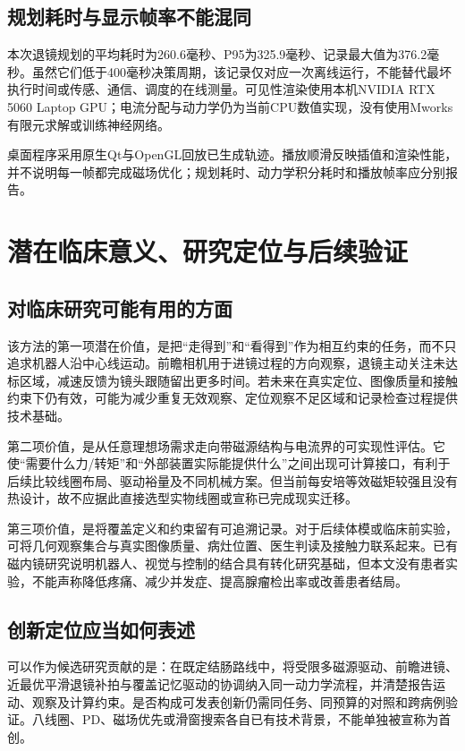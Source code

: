 \documentclass[UTF8,a4paper,zihao=5,fontset=windows]{ctexart}
\begin{document}
\FloatBarrier
\subsection{规划耗时与显示帧率不能混同}
本次退镜规划的平均耗时为260.6毫秒、P95为325.9毫秒、记录最大值为376.2毫秒。虽然它们低于400毫秒决策周期，该记录仅对应一次离线运行，不能替代最坏执行时间或传感、通信、调度的在线测量。可见性渲染使用本机NVIDIA RTX 5060 Laptop GPU；电流分配与动力学仍为当前CPU数值实现，没有使用Mworks有限元求解或训练神经网络。

桌面程序采用原生Qt与OpenGL回放已生成轨迹。播放顺滑反映插值和渲染性能，并不说明每一帧都完成磁场优化；规划耗时、动力学积分耗时和播放帧率应分别报告。

\section{潜在临床意义、研究定位与后续验证}
\subsection{对临床研究可能有用的方面}
该方法的第一项潜在价值，是把“走得到”和“看得到”作为相互约束的任务，而不只追求机器人沿中心线运动。前瞻相机用于进镜过程的方向观察，退镜主动关注未达标区域，减速反馈为镜头跟随留出更多时间。若未来在真实定位、图像质量和接触约束下仍有效，可能为减少重复无效观察、定位观察不足区域和记录检查过程提供技术基础。

第二项价值，是从任意理想场需求走向带磁源结构与电流界的可实现性评估。它使“需要什么力/转矩”和“外部装置实际能提供什么”之间出现可计算接口，有利于后续比较线圈布局、驱动裕量及不同机械方案。但当前每安培等效磁矩较强且没有热设计，故不应据此直接选型实物线圈或宣称已完成现实迁移。

第三项价值，是将覆盖定义和约束留有可追溯记录。对于后续体模或临床前实验，可将几何观察集合与真实图像质量、病灶位置、医生判读及接触力联系起来。已有磁内镜研究说明机器人、视觉与控制的结合具有转化研究基础\cite{martin2020}，但本文没有患者实验，不能声称降低疼痛、减少并发症、提高腺瘤检出率或改善患者结局。

\subsection{创新定位应当如何表述}
可以作为候选研究贡献的是：在既定结肠路线中，将受限多磁源驱动、前瞻进镜、近最优平滑退镜补拍与覆盖记忆驱动的协调纳入同一动力学流程，并清楚报告运动、观察及计算约束。是否构成可发表创新仍需同任务、同预算的对照和跨病例验证。八线圈、PD、磁场优先或滑窗搜索各自已有技术背景，不能单独被宣称为首创。
\end{document}
